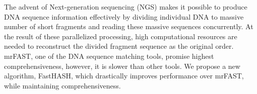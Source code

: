 The advent of Next-generation sequencing (NGS) makes it possible to produce DNA
sequence information effectively by dividing individual DNA to massive number
of short fragments and reading these massive sequences concurrently. At the
result of these parallelized processing, high computational resources are
needed to reconstruct the divided fragment sequence as the original order.
mrFAST, one of the DNA sequence matching tools, promise highest
comprehensiveness, however, it is slower than other tools. We propose a new
algorithm, FastHASH, which drastically improves performance over mrFAST, while
maintaining comprehensiveness.\\
